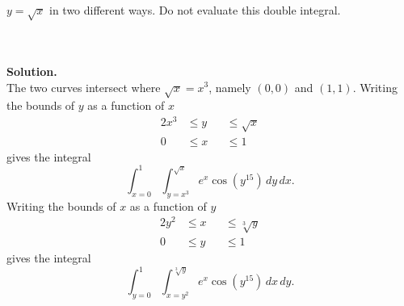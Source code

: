 \documentclass[12 pt]{article}
\begin{document}
\begin{enumerate}
    $y=\sqrt{x}$ in two different ways. Do not evaluate this double integral.
    \begin{figure}[h]
      \centering
    \end{figure}
    \\~\\
    \textbf{Solution.}
    \\
		The two curves intersect where $\sqrt x = x^3$, namely $(0,0)$ and $(1,1)$.
		Writing the bounds of $y$ as a function of $x$ \begin{alignat*}{2}
			x^3 &\leq y &&\leq \sqrt{x} \\
			0 &\leq x   &&\leq 1
		\end{alignat*} gives the integral \[
			\int_{x=0}^1\int_{y=x^3}^{\sqrt x} e^x\cos(y^{15})\,dy\,dx.
		\]
		Writing the bounds of $x$ as a function of $y$ \begin{alignat*}{2}
			y^2 &\leq x &&\leq \sqrt[3]{y} \\
			0 &\leq y   &&\leq 1
		\end{alignat*} gives the integral \[
			\int_{y=0}^1\int_{x=y^2}^{\sqrt[3] y} e^x\cos(y^{15})\,dx\,dy.
		\]
  \end{enumerate}
\end{document}
